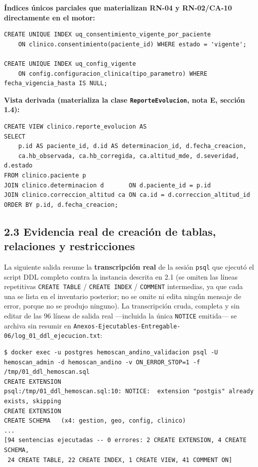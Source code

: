 \documentclass[11pt,a4paper]{article}
\begin{document}
\textbf{Índices únicos parciales que materializan RN-04 y RN-02/CA-10 directamente en el motor:}

\begin{samepage}\begin{verbatim}
CREATE UNIQUE INDEX uq_consentimiento_vigente_por_paciente
    ON clinico.consentimiento(paciente_id) WHERE estado = 'vigente';

CREATE UNIQUE INDEX uq_config_vigente
    ON config.configuracion_clinica(tipo_parametro) WHERE fecha_vigencia_hasta IS NULL;
\end{verbatim}\end{samepage}

\textbf{Vista derivada (materializa la clase \texttt{ReporteEvolucion}, nota E, sección 1.4):}

\begin{samepage}\begin{verbatim}
CREATE VIEW clinico.reporte_evolucion AS
SELECT
    p.id AS paciente_id, d.id AS determinacion_id, d.fecha_creacion,
    ca.hb_observada, ca.hb_corregida, ca.altitud_mde, d.severidad, d.estado
FROM clinico.paciente p
JOIN clinico.determinacion d       ON d.paciente_id = p.id
JOIN clinico.correccion_altitud ca ON ca.id = d.correccion_altitud_id
ORDER BY p.id, d.fecha_creacion;
\end{verbatim}\end{samepage}

\subsection{2.3 Evidencia real de creación de tablas, relaciones y restricciones}\label{evidencia-real-de-creaciuxf3n-de-tablas-relaciones-y-restricciones}

La siguiente salida resume la \textbf{transcripción real} de la sesión \texttt{psql} que ejecutó el script DDL completo contra la instancia descrita en 2.1 (se omiten las líneas repetitivas \texttt{CREATE\ TABLE} / \texttt{CREATE\ INDEX} / \texttt{COMMENT} intermedias, ya que cada una se lista en el inventario posterior; no se omite ni edita ningún mensaje de error, porque no se produjo ninguno). La transcripción cruda, completa y sin editar de las 96 líneas de salida real ---incluida la única \texttt{NOTICE} emitida--- se archiva sin resumir en \texttt{Anexos-Ejecutables-Entregable-06/log\_01\_ddl\_ejecucion.txt}:

\begin{samepage}\begin{verbatim}
$ docker exec -u postgres hemoscan_andino_validacion psql -U hemoscan_admin -d hemoscan_andino -v ON_ERROR_STOP=1 -f /tmp/01_ddl_hemoscan.sql
CREATE EXTENSION
psql:/tmp/01_ddl_hemoscan.sql:10: NOTICE:  extension "postgis" already exists, skipping
CREATE EXTENSION
CREATE SCHEMA   (x4: gestion, geo, config, clinico)
...
[94 sentencias ejecutadas -- 0 errores: 2 CREATE EXTENSION, 4 CREATE SCHEMA,
 24 CREATE TABLE, 22 CREATE INDEX, 1 CREATE VIEW, 41 COMMENT ON]
\end{verbatim}\end{samepage}
\end{document}
